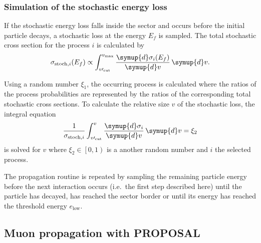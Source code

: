 \subsubsection{Simulation of the stochastic energy loss}

If the stochastic energy loss falls inside the sector and occurs before the initial particle decays, a stochastic loss at the energy $E_f$ is sampled.
The total stochastic cross section for the process $i$ is calculated by
%
\begin{equation}
	\label{eqn:stoch_crosssection}
	\sigma_{\text{stoch},i}(E_f) \propto \int_{v\prime_\text{cut}}^{v_\text{max}} \frac{\symup{d}\sigma_i(E_f)}{\symup{d}v} \, \symup{d}v.
\end{equation}

Using a random number $\xi_1$, the occurring process is calculated where the ratios of the process probabilities are represented by the ratios of the corresponding total stochastic cross sections.
To calculate the relative size $v$ of the stochastic loss, the integral equation
%
\begin{equation}
	\label{eqn:sample_v}
	\frac{1}{\sigma_{\text{stoch},i}} \int_{v\prime_\text{cut}}^{v} \frac{\symup{d}\sigma_i}{\symup{d}v} \, \symup{d}v = \xi_2
\end{equation}
%
is solved for $v$ where $\xi_2 \in \left[0,1\right)$ is a another random number and $i$ the selected process.

The propagation routine is repeated by sampling the remaining particle energy before the next interaction occurs (i.e.\ the first step described here) until the particle has decayed, has reached the sector border or until its energy has reached the threshold energy $e_\text{low}$.

\subsection{Muon propagation with PROPOSAL}



